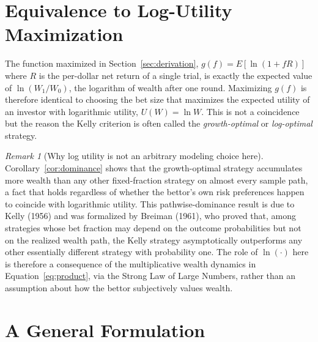 \documentclass[11pt]{article}
\theoremstyle{remark}
\newtheorem*{remark}{Remark}
\theoremstyle{definition}
\begin{document}
\section{Equivalence to Log-Utility Maximization}
\label{sec:logutility}

The function maximized in Section~\ref{sec:derivation}, $g(f) = E[\ln(1+fR)]$ where $R$ is the per-dollar net return of a single trial, is exactly the expected value of $\ln(W_1/W_0)$, the logarithm of wealth after one round. Maximizing $g(f)$ is therefore identical to choosing the bet size that maximizes the expected utility of an investor with logarithmic utility, $U(W) = \ln W$. This is not a coincidence but the reason the Kelly criterion is often called the \emph{growth-optimal} or \emph{log-optimal} strategy.

\begin{remark}[Why log utility is not an arbitrary modeling choice here]
Corollary~\ref{cor:dominance} shows that the growth-optimal strategy accumulates more wealth than any other fixed-fraction strategy on almost every sample path, a fact that holds regardless of whether the bettor's own risk preferences happen to coincide with logarithmic utility. This pathwise-dominance result is due to Kelly (1956) and was formalized by Breiman (1961), who proved that, among strategies whose bet fraction may depend on the outcome probabilities but not on the realized wealth path, the Kelly strategy asymptotically outperforms any other essentially different strategy with probability one. The role of $\ln(\cdot)$ here is therefore a consequence of the multiplicative wealth dynamics in Equation~\eqref{eq:product}, via the Strong Law of Large Numbers, rather than an assumption about how the bettor subjectively values wealth.
\end{remark}

\section{A General Formulation}
\label{sec:general}
\end{document}
